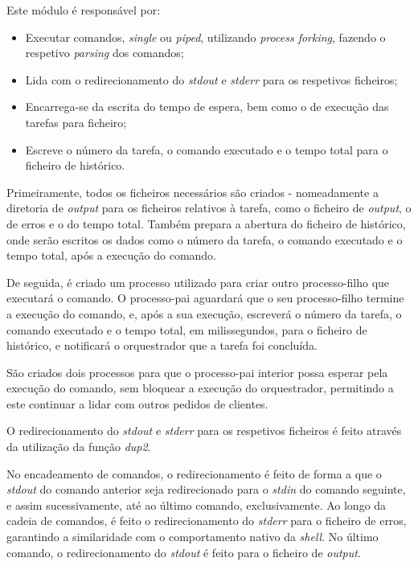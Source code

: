 \documentclass[a4paper,11pt]{scrreprt}
\begin{document}
            Este módulo é responsável por:
            \begin{itemize}
                \item Executar comandos, \textit{single} ou \textit{piped}, utilizando \textit{process forking},
                    fazendo o respetivo \textit{parsing} dos comandos;
                \item Lida com o redirecionamento do \textit{stdout} e \textit{stderr} para os respetivos ficheiros;
                \item Encarrega-se da escrita do tempo de espera, bem como o de execução das tarefas para ficheiro;
                \item Escreve o número da tarefa, o comando executado e o tempo total para o ficheiro de histórico.
            \end{itemize}

            Primeiramente, todos os ficheiros necessários são criados - nomeadamente a diretoria de
            \textit{output} para os ficheiros relativos à tarefa, como o ficheiro de \textit{output},
            o de erros e o do tempo total.
            Também prepara a abertura do ficheiro de histórico, onde serão escritos os dados como o número da tarefa,
            o comando executado e o tempo total, após a execução do comando.

            De seguida, é criado um processo utilizado para criar outro processo-filho que executará o comando.
            O processo-pai aguardará que o seu processo-filho termine a execução do comando, e, após a sua execução,
            escreverá o número da tarefa, o comando executado e o tempo total, em milissegundos, para o ficheiro de histórico,
            e notificará o orquestrador que a tarefa foi concluída.

            São criados dois processos para que o processo-pai interior possa esperar pela execução do comando,
            sem bloquear a execução do orquestrador, permitindo a este continuar a lidar com outros pedidos de clientes.

            O redirecionamento do \textit{stdout} e \textit{stderr} para os respetivos ficheiros é feito
            através da utilização da função \textit{dup2}.

            No encadeamento de comandos, o redirecionamento é feito de forma a que o \textit{stdout} do comando
            anterior seja redirecionado para o \textit{stdin} do comando seguinte, e assim sucessivamente,
            até ao último comando, exclusivamente. Ao longo
            da cadeia de comandos, é feito o redirecionamento do \textit{stderr} para o ficheiro de erros, garantindo
            a similaridade com o comportamento nativo da \textit{shell}. No último comando, o redirecionamento do
            \textit{stdout} é feito para o ficheiro de \textit{output}.
\end{document}
